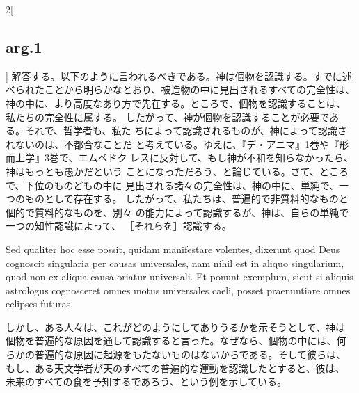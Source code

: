 \documentclass[paper=a4paper,fontsize=10pt,jafontsize=9pt,titlepage]{jlreq}
\begin{document}
\begin{paracol}{2}[\subsection{arg.1}]
解答する。以下のように言われるべきである。神は個物を認識する。すでに述
べられたことから明らかなとおり、被造物の中に見出されるすべての完全性は、
神の中に、より高度なあり方で先在する。ところで、個物を認識することは、
私たちの完全性に属する。
したがって、神が個物を認識することが必要である。それで、哲学者も、私た
ちによって認識されるものが、神によって認識されないのは、不都合なことだ
と考えている。ゆえに、『デ・アニマ』1巻や『形而上学』3巻で、エムペドク
レスに反対して、もし神が不和を知らなかったら、神はもっとも愚かだという
ことになっただろう、と論じている。さて、ところで、下位のものどもの中に
見出される諸々の完全性は、神の中に、単純で、一つのものとして存在する。
したがって、私たちは、普遍的で非質料的なものと個的で質料的なものを、別々
の能力によって認識するが、神は、自らの単純で一つの知性認識によって、
［それらを］認識する。

\switchcolumn*

Sed qualiter hoc esse possit, quidam manifestare volentes, dixerunt
quod Deus cognoscit singularia per causas universales, nam nihil est
in aliquo singularium, quod non ex aliqua causa oriatur universali. Et
ponunt exemplum, sicut si aliquis astrologus cognosceret omnes motus
universales caeli, posset praenuntiare omnes eclipses futuras.

\switchcolumn

しかし、ある人々は、これがどのようにしてありうるかを示そうとして、神は
個物を普遍的な原因を通して認識すると言った。なぜなら、個物の中には、何
らかの普遍的な原因に起源をもたないものはないからである。そして彼らは、
もし、ある天文学者が天のすべての普遍的な運動を認識したとすると、彼は、
未来のすべての食を予知するであろう、という例を示している。


\end{paracol}
\end{document}
